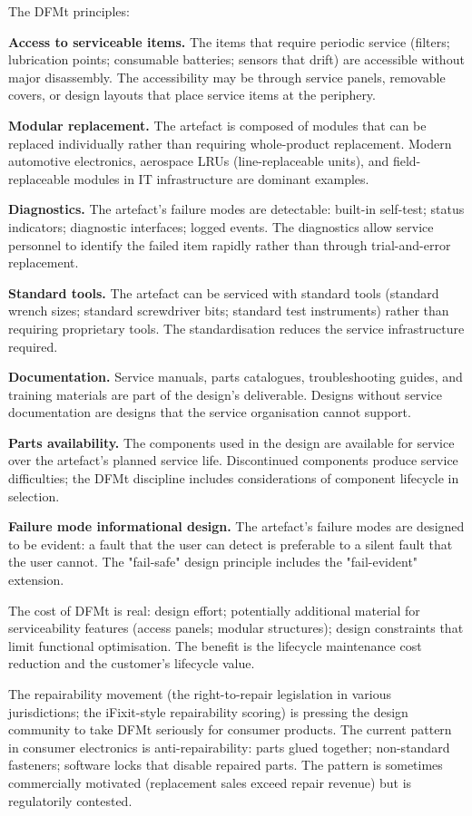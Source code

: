 The DFMt principles:

\textbf{Access to serviceable items.} The items that require periodic service (filters; lubrication points; consumable batteries; sensors that drift) are accessible without major disassembly. The accessibility may be through service panels, removable covers, or design layouts that place service items at the periphery.

\textbf{Modular replacement.} The artefact is composed of modules that can be replaced individually rather than requiring whole-product replacement. Modern automotive electronics, aerospace LRUs (line-replaceable units), and field-replaceable modules in IT infrastructure are dominant examples.

\textbf{Diagnostics.} The artefact's failure modes are detectable: built-in self-test; status indicators; diagnostic interfaces; logged events. The diagnostics allow service personnel to identify the failed item rapidly rather than through trial-and-error replacement.

\textbf{Standard tools.} The artefact can be serviced with standard tools (standard wrench sizes; standard screwdriver bits; standard test instruments) rather than requiring proprietary tools. The standardisation reduces the service infrastructure required.

\textbf{Documentation.} Service manuals, parts catalogues, troubleshooting guides, and training materials are part of the design's deliverable. Designs without service documentation are designs that the service organisation cannot support.

\textbf{Parts availability.} The components used in the design are available for service over the artefact's planned service life. Discontinued components produce service difficulties; the DFMt discipline includes considerations of component lifecycle in selection.

\textbf{Failure mode informational design.} The artefact's failure modes are designed to be evident: a fault that the user can detect is preferable to a silent fault that the user cannot. The "fail-safe" design principle includes the "fail-evident" extension.

The cost of DFMt is real: design effort; potentially additional material for serviceability features (access panels; modular structures); design constraints that limit functional optimisation. The benefit is the lifecycle maintenance cost reduction and the customer's lifecycle value.

The repairability movement (the right-to-repair legislation in various jurisdictions; the iFixit-style repairability scoring) is pressing the design community to take DFMt seriously for consumer products. The current pattern in consumer electronics is anti-repairability: parts glued together; non-standard fasteners; software locks that disable repaired parts. The pattern is sometimes commercially motivated (replacement sales exceed repair revenue) but is regulatorily contested.

